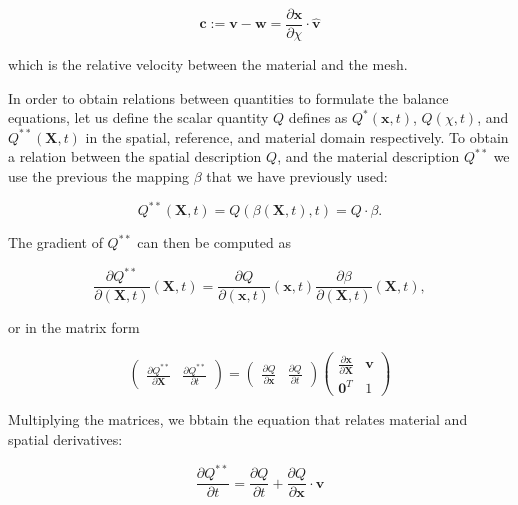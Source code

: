 \documentclass[a4paper,11pt,openright,twoside]{book}
\begin{document}
\begin{equation}
\mathbf{c} := \mathbf{v-w} = \frac{\partial \mathbf{x}}{\partial \chi} \cdot \hat{\mathbf{v}}
\end{equation}

which is the relative velocity between the material and the mesh.

In order to obtain relations between quantities to formulate the balance equations, let us define the scalar quantity $Q$ defines as $Q^{*}(\mathbf{x},t)$, $Q(\chi,t)$, and $Q^{**}(\mathbf{X},t)$ in the spatial, reference, and material domain respectively.
To obtain a relation between the spatial description $Q$, and the material description $Q^{**}$ we use the previous the mapping $\beta$ that we have previously used:

\begin{equation}
Q^{**}(\mathbf{X},t) = Q(\beta(\mathbf{X},t),t) = Q \cdot \beta.
\end{equation}

The gradient of $Q^{**}$ can then be computed as

\begin{equation}
\label{eq:ale:1}
\frac{\partial Q^{**}}{\partial (\mathbf{X}, t)} (\mathbf{X},t) = 
\frac{\partial Q}{\partial (\mathbf{x}, t)} (\mathbf{x},t)
\frac{\partial \beta}{\partial (\mathbf{X}, t)} (\mathbf{X},t),
\end{equation}

or in the matrix form

\begin{equation}
\label{eq:ale:2}
\begin{pmatrix}
\frac{\partial Q^{**}}{\partial \mathbf{X}} & \frac{\partial Q^{**}}{\partial t}
\end{pmatrix} = 
\begin{pmatrix}
\frac{\partial Q}{\partial \mathbf{x}} & \frac{\partial Q}{\partial t}
\end{pmatrix}
\begin{pmatrix}
\frac{\partial \mathbf{x}}{\partial \mathbf{X}} & \mathbf{v}\\
\mathbf{0}^T & 1
\end{pmatrix} 
\end{equation}

Multiplying the matrices, we bbtain the equation that relates material and spatial derivatives:

\begin{equation}
\label{eq:ale:3}
\frac{\partial Q^{**}}{\partial t} = \frac{\partial Q}{\partial t}
+ \frac{\partial Q}{\partial \mathbf{x}} \cdot \mathbf{v}
\end{equation}
\end{document}

